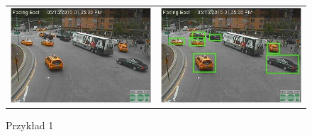 \documentclass{article}
\begin{document}
\begin{figure}
\begin{center}
\begin{tabular}[c]{c c}
\includegraphics[scale=0.4]{MWSnap055.jpg} &
\includegraphics[scale=0.4]{11119220_994387450571628_742912767_n.jpg} \\
\end{tabular}
\end{center}
\caption{Przykład 1}
\label{fig:przyklad_1}
\end{figure}
\end{document}
